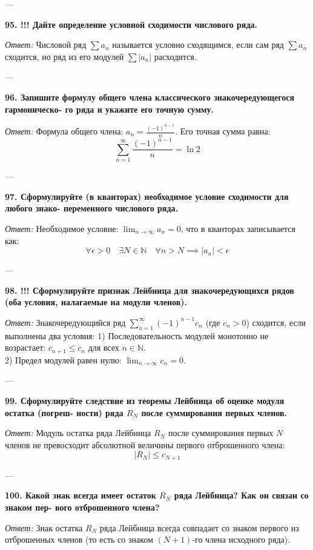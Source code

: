 \documentclass{article}
\begin{document}
---

\textbf{95. !!! Дайте определение условной сходимости числового ряда.}

\textit{Ответ:} Числовой ряд $\sum a_n$ называется условно сходящимся, если сам ряд $\sum a_n$ сходится, но ряд из его модулей $\sum |a_n|$ расходится.

---

\textbf{96. Запишите формулу общего члена классического знакочередующегося гармоническо- го ряда и укажите его точную сумму.}

\textit{Ответ:} Формула общего члена: $a_n = \frac{(-1)^{n-1}}{n}$. Его точная сумма равна:
$$ \sum_{n=1}^{\infty} \frac{(-1)^{n-1}}{n} = \ln 2 $$

---

\textbf{97. Сформулируйте (в кванторах) необходимое условие сходимости для любого знако- переменного числового ряда.}

\textit{Ответ:} Необходимое условие: $\lim_{n \to \infty} a_n = 0$, что в кванторах записывается как:
$$ \forall \epsilon > 0 \quad \exists N \in \mathbb{N} \quad \forall n > N \implies |a_n| < \epsilon $$

---

\textbf{98. !!! Сформулируйте признак Лейбница для знакочередующихся рядов (оба условия, налагаемые на модули членов).}

\textit{Ответ:} Знакочередующийся ряд $\sum_{n=1}^{\infty} (-1)^{n-1} c_n$ (где $c_n > 0$) сходится, если выполнены два условия:
1) Последовательность модулей монотонно не возрастает: $c_{n+1} \le c_n$ для всех $n \in \mathbb{N}$. \\
2) Предел модулей равен нулю: $\lim_{n \to \infty} c_n = 0$.

---

\textbf{99. Сформулируйте следствие из теоремы Лейбница об оценке модуля остатка (погреш- ности) ряда $R_{N}$ после суммирования первых членов.}

\textit{Ответ:} Модуль остатка ряда Лейбница $R_N$ после суммирования первых $N$ членов не превосходит абсолютной величины первого отброшенного члена:
$$ |R_N| \le c_{N+1} $$

---

\textbf{100. Какой знак всегда имеет остаток $R_{N}$ ряда Лейбница? Как он связан со знаком пер- вого отброшенного члена?}

\textit{Ответ:} Знак остатка $R_N$ ряда Лейбница всегда совпадает со знаком первого из отброшенных членов (то есть со знаком $(N+1)$-го члена исходного ряда).
\end{document}
